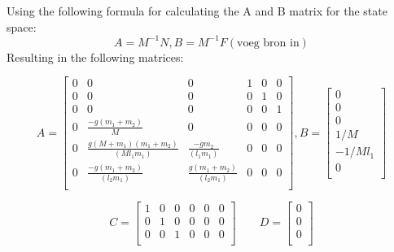 \documentclass[10pt]{article}
\begin{document}
    Using the following formula for calculating the A and B matrix for the state space:
    \begin{equation}
        A = M^{-1}N, B = M^{-1}F (\text{voeg bron in}) 
    \end{equation}
    Resulting in the following matrices:


    \begin{equation*}
        A = 
        \begin{bmatrix}
            0 & 0 & 0 & 1 & 0 & 0 \\
            0 & 0 & 0 & 0 & 1 & 0 \\
            0 & 0 & 0 & 0 & 0 & 1 \\
            0 & \frac{-g(m_1 + m_2)}{M} & 0 & 0 & 0 & 0 \\
            0 & \frac{g(M + m_1)(m_1 + m_2)}{(Ml_1m_1)} & \frac{-g m_2}{(l_1 m_1)} & 0 & 0 & 0 \\
            0 & \frac{-g(m_1 + m_2)}{(l_2 m_1)} & \frac{g(m_1 + m_2)}{(l_2 m_1)} & 0 & 0 & 0 \\
        \end{bmatrix}
        ,         B = 
        \begin{bmatrix}
            0 \\
            0 \\
            0 \\
            1/M \\
            -1/Ml_1 \\
            0 \\
        \end{bmatrix}
    \end{equation*}
    
    \begin{equation*}
        C = 
        \begin{bmatrix}
            1&0&0&0&0&0\\
            0&1&0&0&0&0\\
            0&0&1&0&0&0\\
        \end{bmatrix}
        \qquad D= 
        \begin{bmatrix}
            0\\
            0\\
            0\\
        \end{bmatrix}
    \end{equation*}
\end{document}
